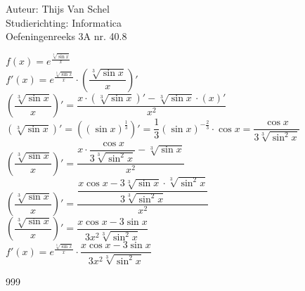 \documentclass[a4paper]{article}
\begin{document}
  
\noindent \large Auteur: Thijs Van Schel\\
\noindent \large Studierichting: Informatica\\
\noindent \large Oefeningenreeks 3A nr. 40.8 \\

\medskip

\normalsize

$f(x) = e^{\tfrac{\sqrt[3]{\sin x}}{x}}$\\

$f'(x) = e^{\tfrac{\sqrt[3]{\sin x}}{x}} \cdot \left(\dfrac{\sqrt[3]{\sin x}}{x}\right)'$\\

$\left(\dfrac{\sqrt[3]{\sin x}}{x}\right)' = \dfrac{x \cdot (\sqrt[3]{\sin x})' - \sqrt[3]{\sin x} \cdot (x)'}{x^2}$\\

$(\sqrt[3]{\sin x})' = \left((\sin x)^{\tfrac{1}{3}}\right)' = \dfrac{1}{3}(\sin x)^{-\tfrac{2}{3}} \cdot \cos x = \dfrac{\cos x}{3\sqrt[3]{\sin^2 x}}$\\

$\left(\dfrac{\sqrt[3]{\sin x}}{x}\right)' = \dfrac{x \cdot \dfrac{\cos x}{3\sqrt[3]{\sin^2 x}} - \sqrt[3]{\sin x}}{x^2}$\\

$\left(\dfrac{\sqrt[3]{\sin x}}{x}\right)' = \dfrac{\dfrac{x \cos x - 3 \sqrt[3]{\sin x} \cdot \sqrt[3]{\sin^2 x}}{3\sqrt[3]{\sin^2 x}}}{x^2}$\\

$\left(\dfrac{\sqrt[3]{\sin x}}{x}\right)' = \dfrac{x \cos x - 3\sin x}{3x^2\sqrt[3]{\sin^2 x}}$\\

$f'(x) = e^{\tfrac{\sqrt[3]{\sin x}}{x}} \cdot \dfrac{x \cos x - 3\sin x}{3x^2\sqrt[3]{\sin^2 x}}$\\

\begin{thebibliography}{999}
\end{thebibliography}
\end{document}
